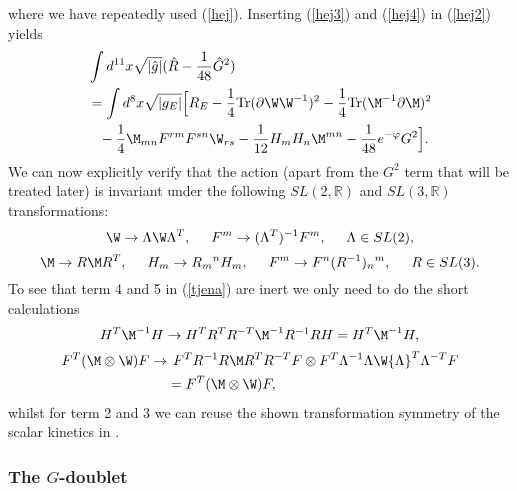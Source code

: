 where we have repeatedly used (\ref{hej}). Inserting (\ref{hej3}) and (\ref{hej4}) in (\ref{hej2}) yields
\begin{align}
&\int d^{11}x \sqrt{|\hat{g}|} (\hat{R}-{1 \over 48}\hat{G}^2) \nonumber \\
&= \int d^8x \sqrt{|g_E|} \Big{[} R_E - {1 \over 4}\mbox{Tr}(\partial \W \W^{-1})^2 -{1 \over 4}\mbox{Tr}(\M^{-1}\partial \M)^2 \nonumber \\
&\phantom{=}- {1 \over 4}\M_{mn}F^{rm}F^{sn}\W_{rs} - {1 \over 12}H_mH_n\M^{mn}- {1 \over 48}e^{-\varphi}G^2 \Big{]}.
\label{tjena}
\end{align}
We can now explicitly verify that the action (apart from the $G^2$ term that will be treated later) is invariant under the
following $SL(2,{\mathbb R})$ and $SL(3,{\mathbb R})$ transformations:
\begin{equation}
\W \rightarrow \Lambda \W \Lambda^{T}, \hspace{0.5cm} F^{m} \rightarrow (\Lambda^{T})^{-1}F^m, \hspace{0.5cm} \Lambda \in SL(2),
\end{equation}
\begin{equation}
\M \rightarrow R\M R^T, \hspace{0.5cm} H_m \rightarrow R{_m}^n H_m, \hspace{0.5cm} F^m \rightarrow F^n (R^{-1}){_n}^m, \hspace{0.5cm} R \in SL(3).
\label{sl3trans}
\end{equation}
To see that term 4 and 5 in (\ref{tjena}) are inert we only need to do the short calculations
\begin{equation}
H^T \M^{-1}H \rightarrow H^T R^T R^{-T}\M^{-1}R^{-1}RH = H^T \M^{-1}H,
\end{equation}
\begin{align}
F^T(\M \otimes \W)F \rightarrow & \hspace{0.15cm} F^T R^{-1} R\M R^T R^{-T}F \otimes F^T \Lambda^{-1} \Lambda \W {\Lambda}^{T} {\Lambda}^{-T}F \nonumber \\
&=F^T(\M \otimes \W)F,
\end{align}
whilst for term 2 and 3 we can reuse the shown transformation symmetry of the scalar kinetics in .

\subsubsection{The $G$-doublet}

